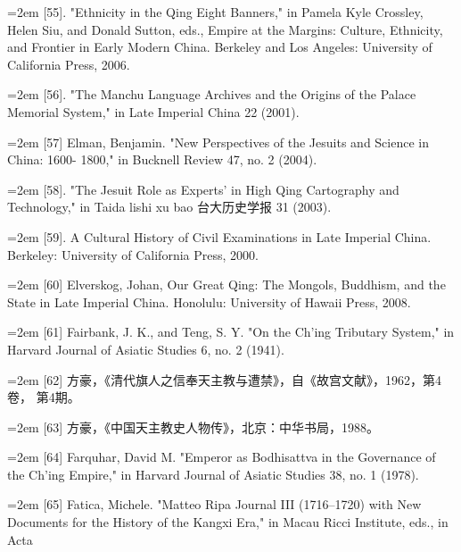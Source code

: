\noindent\hangindent=2em
[55]. "Ethnicity in the Qing Eight Banners," in Pamela Kyle Crossley, Helen%
\space%
Siu, and Donald Sutton, eds., Empire at the Margins: Culture, Ethnicity, and%
\space%
Frontier in Early Modern China. Berkeley and Los Angeles: University of%
\space%
California Press, 2006.%
\par
\noindent\hangindent=2em
[56]. "The Manchu Language Archives and the Origins of the Palace Memorial%
\space%
System," in Late Imperial China 22 (2001).%
\par
\noindent\hangindent=2em
[57] Elman, Benjamin. "New Perspectives of the Jesuits and Science in China: 1600-%
1800," in Bucknell Review 47, no. 2 (2004).%
\par
\noindent\hangindent=2em
[58]. "The Jesuit Role as Experts' in High Qing Cartography and Technology," in%
\space%
Taida lishi xu bao 台大历史学报 31 (2003).%
\par
\noindent\hangindent=2em
[59]. A Cultural History of Civil Examinations in Late Imperial China. Berkeley:%
\space%
University of California Press, 2000.%
\par
\noindent\hangindent=2em
[60] Elverskog, Johan, Our Great Qing: The Mongols, Buddhism, and the State in Late%
\space%
Imperial China. Honolulu: University of Hawaii Press, 2008.%
\par
\noindent\hangindent=2em
[61] Fairbank, J. K., and Teng, S. Y. "On the Ch'ing Tributary System," in Harvard%
\space%
Journal of Asiatic Studies 6, no. 2 (1941).%
\par
\noindent\hangindent=2em
[62] 方豪，《清代旗人之信奉天主教与遭禁》，自《故宫文献》，1962，第4卷，%
第4期。%
\par
\noindent\hangindent=2em
[63] 方豪，《中国天主教史人物传》，北京：中华书局，1988。%
\par
\noindent\hangindent=2em
[64] Farquhar, David M. "Emperor as Bodhisattva in the Governance of the Ch’ing%
\space%
Empire," in Harvard Journal of Asiatic Studies 38, no. 1 (1978).%
\par
\noindent\hangindent=2em
[65] Fatica, Michele. "Matteo Ripa Journal III (1716–1720) with New Documents%
\space%
for the History of the Kangxi Era," in Macau Ricci Institute, eds., in Acta%
